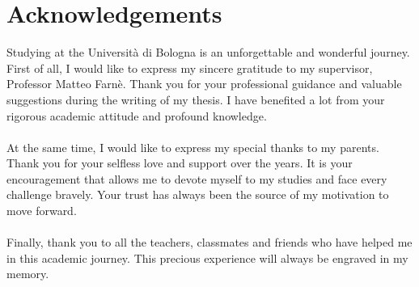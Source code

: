 \chapter*{Acknowledgements}
Studying at the Università di Bologna is an unforgettable and wonderful journey. First of all, I would like to express my sincere gratitude to my supervisor, Professor Matteo Farnè. Thank you for your professional guidance and valuable suggestions during the writing of my thesis. I have benefited a lot from your rigorous academic attitude and profound knowledge.\\
\\
At the same time, I would like to express my special thanks to my parents. Thank you for your selfless love and support over the years. It is your encouragement that allows me to devote myself to my studies and face every challenge bravely. Your trust has always been the source of my motivation to move forward.\\
\\
Finally, thank you to all the teachers, classmates and friends who have helped me in this academic journey. This precious experience will always be engraved in my memory.